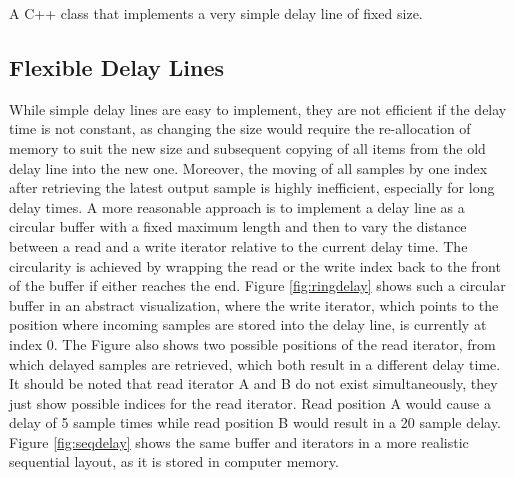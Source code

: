 \documentclass[12pt,twoside]{report}
\begin{document}
\begin{table}[t!]
  \caption{A C++ class that implements a very simple delay line of fixed size.}
  \label{code:simpledelay}
\end{table}

\pagebreak

\subsection{Flexible Delay Lines}

While simple delay lines are easy to implement, they are not efficient if the delay time is not constant, as changing the size would require the re-allocation of memory to suit the new size and subsequent copying of all items from the old delay line into the new one. Moreover, the moving of all samples by one index after retrieving the latest output sample is highly inefficient, especially for long delay times. A more reasonable approach is to implement a delay line as a circular buffer with a fixed maximum length and then to vary the distance between a read and a write iterator relative to the current delay time. The circularity is achieved by wrapping the read or the write index back to the front of the buffer if either reaches the end. Figure \ref{fig:ringdelay} shows such a circular buffer in an abstract visualization, where the write iterator, which points to the position where incoming samples are stored into the delay line, is currently at index 0. The Figure also shows two possible positions of the read iterator, from which delayed samples are retrieved, which both result in a different delay time. It should be noted that read iterator A and B do not exist simultaneously, they just show possible indices for the read iterator. Read position A would cause a delay of 5 sample times while read position B would result in a 20 sample delay. Figure \ref{fig:seqdelay} shows the same buffer and iterators in a more realistic sequential layout, as it is stored in computer memory.
\end{document}
